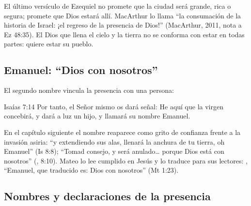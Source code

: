 El último versículo de Ezequiel no promete que la ciudad será grande, rica o segura; promete que Dios estará allí. MacArthur lo llama ``la consumación de la historia de Israel: ¡el regreso de la presencia de Dios!'' (MacArthur, 2011, nota a Ez 48:35). El Dios que llena el cielo y la tierra no se conforma con estar en todas partes: quiere estar  su pueblo.

\subsection{Emanuel: “Dios con nosotros”}

El segundo nombre vincula la presencia con una persona:

\begin{verso}{Isaías 7:14}
Por tanto, el Señor mismo os dará señal: He aquí que la virgen concebirá, y dará a luz un hijo, y llamará su nombre Emanuel.
\end{verso}

En el capítulo siguiente el nombre reaparece como grito de confianza frente a la invasión asiria: ``y extendiendo sus alas, llenará la anchura de tu tierra, oh Emanuel'' (Is 8:8); ``Tomad consejo, y será anulado\ldots{} porque Dios está con nosotros'' (, 8:10). Mateo lo lee cumplido en Jesús y lo traduce para sus lectores: , ``Emanuel, que traducido es: Dios con nosotros'' (Mt 1:23).


\subsection{Nombres y declaraciones de la presencia}

